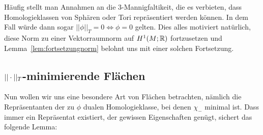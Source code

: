         Häufig stellt man Annahmen an die 3-Mannigfaltikeit, die es verbieten, dass Homologieklassen von Sphären oder Tori repräsentiert werden können. In dem Fall würde dann sogar $||\phi||_T=0 \Leftrightarrow \phi=0$ gelten. Dies alles motiviert natürlich, diese Norm zu einer Vektorraumnorm auf $H^1(M;\mathbb{R})$ fortzusetzen und Lemma~\ref{lem:fortsetzungnorm} belohnt uns mit einer solchen Fortsetzung. 
     
	\subsection{$||\cdot||_T$-minimierende Flächen}

Nun wollen wir uns eine besondere Art von Flächen betrachten, nämlich die Repräsentanten der zu $\phi$ dualen Homologieklasse, bei denen $\chi_-$ minimal ist. Dass immer ein Repräsentat existiert, der gewissen Eigenschaften genügt, sichert das folgende Lemma:


